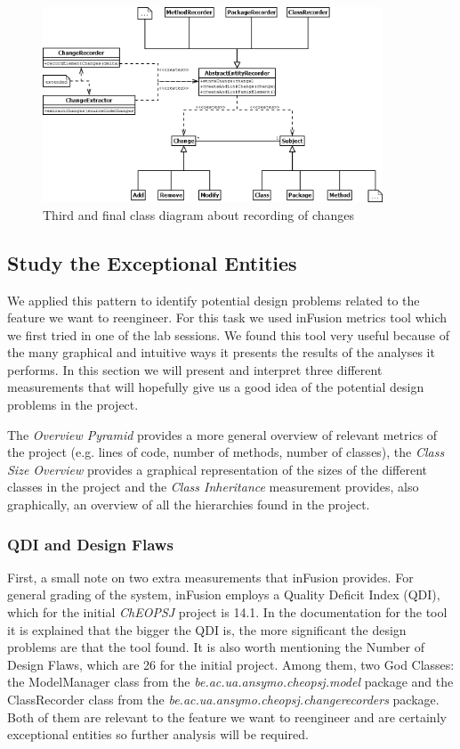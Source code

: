 \documentclass[a4paper]{article}
\begin{document}
\begin{figure}[h]
\centering
\includegraphics[width=0.9\textwidth]{Images/spec2}
\caption{Third and final class diagram about recording of changes}
\label{fig:spec2}
\end{figure}

\subsection{Study the Exceptional Entities}
We applied this pattern to identify potential design problems related to the feature we want to reengineer. For this task we used inFusion metrics tool which we first tried in one of the lab sessions. We found this tool very useful because of the many graphical and intuitive ways it presents the results of the analyses it performs. In this section we will present and interpret three different measurements that will hopefully give us a good idea of the potential design problems in the project. 

The \emph{Overview Pyramid} provides a more general overview of relevant metrics of the project (e.g. lines of code, number of methods, number of classes), the \emph{Class Size Overview} provides a graphical representation of the sizes of the different classes in the project and the \emph{Class Inheritance} measurement provides, also graphically, an overview of all the hierarchies found in the project.

\subsubsection{QDI and Design Flaws}
First, a small note on two extra measurements that inFusion provides. For general grading of the system, inFusion employs a Quality Deficit Index (QDI), which for the initial \emph{ChEOPSJ} project is 14.1. In the documentation for the tool it is explained that the bigger the QDI is, the more significant the design problems are that the tool found. It is also worth mentioning the Number of Design Flaws, which are 26 for the initial project. Among them, two God Classes: the ModelManager class from the \emph{be.ac.ua.ansymo.cheopsj.model} package and the ClassRecorder class from the \emph{be.ac.ua.ansymo.cheopsj.changerecorders} package. Both of them are relevant to the feature we want to reengineer and are certainly exceptional entities so further analysis will be required.
\end{document}
